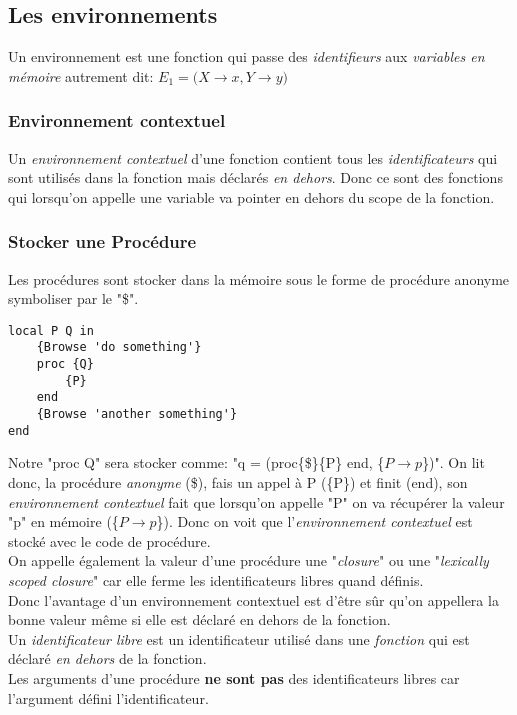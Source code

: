 \documentclass{report}
\begin{document}
\subsection{Les environnements}
Un environnement est une fonction qui passe des \textit{identifieurs} aux \textit{variables en mémoire} autrement dit: $E_1 = ({X \rightarrow x, Y \rightarrow y)}$

\subsubsection{Environnement contextuel}
Un \textit{environnement contextuel} d'une fonction contient tous les \textit{identificateurs} qui sont utilisés dans la fonction mais déclarés \textit{en dehors}. Donc ce sont des fonctions qui lorsqu'on appelle une variable va pointer en dehors du scope de la fonction.

\subsubsection{Stocker une Procédure}
Les procédures sont stocker dans la mémoire sous le forme de procédure anonyme symboliser par le "\$".
\begin{lstlisting}
local P Q in
	{Browse 'do something'}
	proc {Q}
		{P}
	end
	{Browse 'another something'}
end
\end{lstlisting}
Notre "proc {Q}" sera stocker comme: "q = (proc\{\$\}\{P\} end, \{$P\rightarrow p$\})". On lit donc, la procédure \textit{anonyme} (\$), fais un appel à P (\{P\}) et finit (end), son \textit{environnement contextuel} fait que lorsqu'on appelle "P" on va récupérer la valeur "p" en mémoire (\{$P\rightarrow p$\}). Donc on voit que l'\textit{environnement contextuel} est stocké avec le code de procédure.\\
On appelle également la valeur d'une procédure une "\textit{closure}" ou une "\textit{lexically scoped closure}" car elle ferme les identificateurs libres quand définis.\\
Donc l'avantage d'un environnement contextuel est d'être sûr qu'on appellera la bonne valeur même si elle est déclaré en dehors de la fonction.\\

Un \textit{identificateur libre} est un identificateur utilisé dans une \textit{fonction} qui est déclaré \textit{en dehors} de la fonction.\\
Les arguments d'une procédure \textbf{ne sont pas} des identificateurs libres car l'argument défini l'identificateur.
\end{document}

